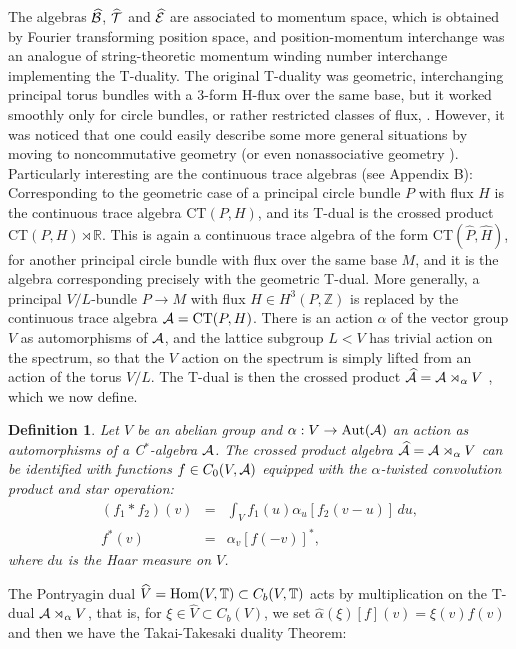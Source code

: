 \documentclass[11pt]{article}
\newcommand{\real}{{\mathbb R}}
\newcommand{\torus}{{\mathbb T}}
\newcommand{\integer}{{\mathbb Z}}
\newcommand{\dual}[1]{{\widehat{#1}}}
\newcommand{\alg}{{\cal A}}
\newcommand{\cb}{{\cal B}}
\newcommand{\ce}{{\cal E}}
\newcommand{\cT}{{\cal T}}
\newcommand{\aut}{{\rm Aut}}
\newcommand{\wh}[1]{\widehat{#1}}
\newtheorem{definition}[theorem]{Definition}
\begin{document}
The algebras $\wh{\cb}$, $\wh{\cT}$ and $\wh{\ce}$ are associated to momentum space, which is obtained by Fourier transforming position space, and  position-momentum interchange was an analogue of string-theoretic momentum winding number interchange implementing the T-duality.
The original T-duality was geometric, interchanging principal torus bundles with a 3-form H-flux over the same base, but it worked smoothly only for circle bundles, or rather restricted classes of flux, \cite{BEM}. However, it was noticed that one could easily describe some more general situations by moving to noncommutative geometry \cite{MR} (or even nonassociative geometry \cite{BHM06,BHM10}). Particularly interesting are the continuous trace algebras (see Appendix B):
Corresponding to the geometric case of a principal circle bundle $P$ with flux $H$ is the continuous trace algebra CT$(P,H)$, and its T-dual is the crossed product CT$(P,H)\rtimes \real$. This is again a continuous trace algebra of the form CT$(\wh{P},\wh{H})$, for another principal circle bundle with flux over the same base $M$, and it is the algebra corresponding precisely with the geometric T-dual. More generally, a principal $V/L$-bundle $P \to M$ with flux $H \in H^3(P,\integer)$ is replaced by the continuous trace algebra $\alg = {\rm CT}(P,H)$. There is an action $\alpha$ of the  vector group $V$  as automorphisms of $\alg$, and the lattice subgroup $L < V$ has trivial action on the spectrum, so that the $V$ action on the spectrum is simply lifted from an action of the torus $V/L$. The T-dual is then the crossed product $\wh{\alg} = \alg\rtimes_\alpha V$ \cite{RR}, which we now define.

\begin{definition}
Let $V$ be an abelian group and $\alpha: V \to \aut(\alg)$ an action as automorphisms of a C$^*$-algebra $\alg$.
The crossed product algebra $\dual{\alg} = \alg\rtimes_\alpha V$ can be identified with functions $f \in C_0(V,\alg)$  equipped with the $\alpha$-twisted convolution product and star operation:
\begin{eqnarray*}
(f_1*f_2)(v) &=& \int_V f_1(u)\alpha_u[f_2(v-u)]\,du,\\
f^*(v) &=& \alpha_v[f(-v)]^*,
\end{eqnarray*}
where $du$ is the Haar measure on $V$.
\end{definition}

The  Pontryagin dual $\wh{V} = {\rm Hom}(V,\torus) \subset C_b(V,\torus)$ acts by multiplication on the T-dual $\alg\rtimes_\alpha V$, that is, for $\xi\in \wh{V} \subset C_b(V)$, we set $\wh{\alpha}(\xi)[f](v) = \xi(v)f(v)$ and then we have the Takai-Takesaki duality Theorem:
\end{document}
